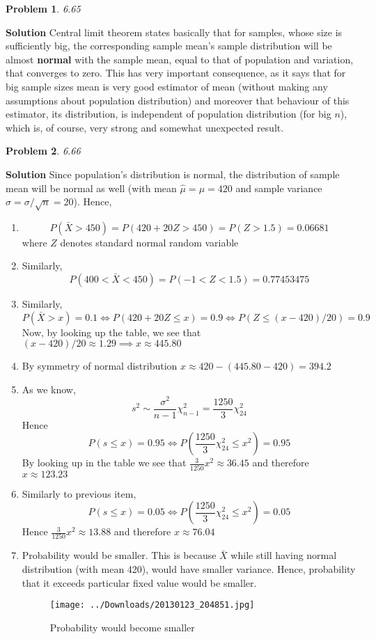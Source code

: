 \documentclass[8pt]{article} %
\newtheorem{prob}{Problem}
\newenvironment{solution}%
{\par\textbf{Solution}\space }%
{\par}
\begin{document}
\begin{prob}6.65\end{prob}
\begin{solution}
	Central limit theorem states basically that for samples, whose size is sufficiently big, the corresponding sample mean's sample
	distribution will be almost \textbf{normal} with the sample mean, equal to that of population and variation, that converges to zero.
	This has very important consequence, as it says that for big sample sizes mean is very good estimator of mean (without making any
	assumptions about population distribution) and moreover that behaviour of this estimator, its distribution, is independent
	of population distribution (for big $n$), which is, of course, very strong and somewhat unexpected result.
\end{solution}
\begin{prob}6.66\end{prob}
\begin{solution}
	Since population's distribution is normal, the distribution of sample mean will be normal as well (with mean $\hat{\mu}=\mu=420$ and
	sample variance $\hat{\sigma}=\sigma/\sqrt{n}=20$). Hence,
\begin{enumerate}[label=\alph*.]
	\item{
	\[P(\bar{X}>450)=P(420+20Z>450)=P(Z>1.5)=0.06681\]
	where $Z$ denotes standard normal random variable
		}
	\item{Similarly, \[P(400<\bar{X}<450)=P(-1<Z<1.5)=0.77453475\]}
	\item{Similarly,
		\[P(\bar{X}>x)=0.1\iff P(420+20Z\leq x)=0.9\iff P(Z\leq (x-420)/20)=0.9\]
		Now, by looking up the table, we see that $(x-420)/20\approx 1.29\implies x\approx 445.80$
		}
	\item{By symmetry of normal distribution $x\approx 420-(445.80-420)=394.2$}
	\item{As we know, \[s^2\sim \frac{\sigma^2}{n-1}\chi_{n-1}^2=\frac{1250}{3}\chi_{24}^2\]
		Hence\[P(s\leq x)=0.95\iff P(\frac{1250}{3}\chi_{24}^2\leq x^2)=0.95\]
		By looking up in the table we see that $\frac{3}{1250}x^2\approx 36.45$ and therefore $x\approx 123.23$
		}
	\item{Similarly to previous item,
		\[P(s\leq x)=0.05\iff P(\frac{1250}{3}\chi_{24}^2\leq x^2)=0.05\]
		Hence $\frac{3}{1250}x^2\approx 13.88$ and therefore $x\approx 76.04$
		}
	\item{Probability would be smaller. This is because $\bar{X}$ while still having normal distribution (with mean 420),
		would have smaller variance.
		Hence, probability that it exceeds particular fixed value would be smaller.
		\begin{figure}[H]
		\centering
		\texttt{[image: ../Downloads/20130123\_204851.jpg]}
		\caption{Probability would become smaller}
		\end{figure}
		}
\end{enumerate}
\end{solution}
\end{document}
